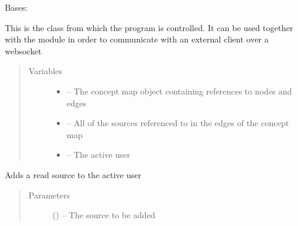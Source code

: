 \documentclass[letterpaper,10pt,english]{sphinxmanual}
\begin{document}
\begin{fulllineitems}
\label{\detokenize{consumer:consumer.Consumer}}
Bases: \href{https://docs.python.org/2/library/functions.html\#object}{}

This is the class from which the program is controlled. It can be used together with the {\hyperref[\detokenize{handler:module-handler}]{}} module in order to communicate with an external client over a websocket
\begin{quote}\begin{description}
\item[{Variables}] \leavevmode\begin{itemize}
\item {} 
{\hyperref[\detokenize{concept_map:module-concept_map}]{}} -- The concept map object containing references to nodes and edges

\item {} 
 -- All of the sources referenced to in the edges of the concept map

\item {} 
{\hyperref[\detokenize{user:module-user}]{}} -- The active user

\end{itemize}

\end{description}\end{quote}

\begin{fulllineitems}
\label{\detokenize{consumer:consumer.Consumer.add_source}}
Adds a read source to the active user
\begin{quote}\begin{description}
\item[{Parameters}] \leavevmode
{} (\href{https://docs.python.org/2/library/string.html\#module-string}{}) -- The source to be added

\end{description}\end{quote}

\end{fulllineitems}


\end{fulllineitems}
\end{document}
